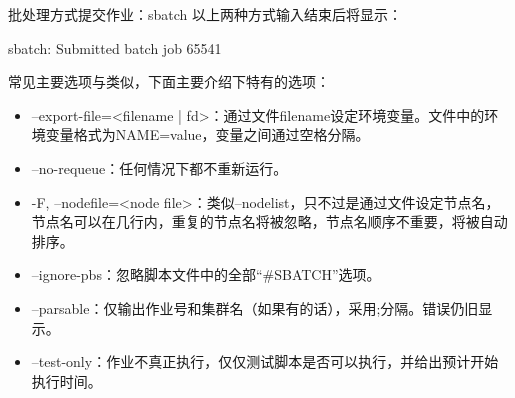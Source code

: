 \begin{frame}[fragile]{批处理方式提交作业：sbatch}
以上两种方式输入结束后将显示：
\begin{OUT}
sbatch: Submitted batch job 65541
\end{OUT}

常见主要选项与类似，下面主要介绍下特有的选项：
\begin{itemize}
	\item --export-file=<filename | fd>：通过文件filename设定环境变量。文件中的环境变量格式为NAME=value，变量之间通过空格分隔。
	\item --no-requeue：任何情况下都不重新运行。
	\item -F, --nodefile=<node file>：类似--nodelist，只不过是通过文件设定节点名，节点名可以在几行内，重复的节点名将被忽略，节点名顺序不重要，将被自动排序。
	\item --ignore-pbs：忽略脚本文件中的全部``\#SBATCH''选项。
	\item --parsable：仅输出作业号和集群名（如果有的话），采用;分隔。错误仍旧显示。
	\item --test-only：作业不真正执行，仅仅测试脚本是否可以执行，并给出预计开始执行时间。
\end{itemize}
\end{frame}


